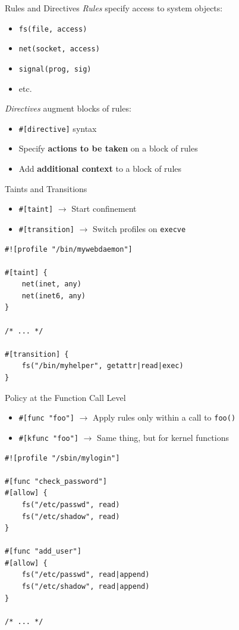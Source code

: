 \documentclass[12pt, dvipsnames, aspectratio=169]{beamer}
\begin{document}
\begin{frame}[c, fragile]{Rules and Directives}
\textit{Rules} specify access to system objects:
\begin{itemize}
    \item \lstinline[language=bpfbox]|fs(file, access)|
    \item \lstinline[language=bpfbox]|net(socket, access)|
    \item \lstinline[language=bpfbox]|signal(prog, sig)|
    \item etc.
\end{itemize}

\vfill
\textit{Directives} augment blocks of rules:
\begin{itemize}
    \item \lstinline[language=bpfbox]|#[directive]| syntax
    \item Specify \textbf{actions to be taken} on a block of rules
    \item Add \textbf{additional context} to a block of rules
\end{itemize}
\end{frame}

\begin{frame}[c, fragile]{Taints and Transitions}
\begin{itemize}
    \item \lstinline[language=bpfbox]|#[taint]|  $\rightarrow$ Start confinement
    \item \lstinline[language=bpfbox]|#[transition]|  $\rightarrow$ Switch profiles on \texttt{execve}
\end{itemize}
\vfill
\begin{lstlisting}[language=bpfbox, xleftmargin=.25\textwidth]
#![profile "/bin/mywebdaemon"]

#[taint] {
    net(inet, any)
    net(inet6, any)
}

/* ... */

#[transition] {
    fs("/bin/myhelper", getattr|read|exec)
}
\end{lstlisting}
\end{frame}

\begin{frame}[c, fragile]{Policy at the Function Call Level}
\begin{itemize}
    \item \lstinline[language=bpfbox]|#[func "foo"]|  $\rightarrow$ Apply rules only within a call to \texttt{foo()}
    \item \lstinline[language=bpfbox]|#[kfunc "foo"]|  $\rightarrow$ Same thing, but for kernel functions
\end{itemize}
\vfill
\begin{lstlisting}[language=bpfbox, xleftmargin=.25\textwidth]
#![profile "/sbin/mylogin"]

#[func "check_password"]
#[allow] {
    fs("/etc/passwd", read)
    fs("/etc/shadow", read)
}

#[func "add_user"]
#[allow] {
    fs("/etc/passwd", read|append)
    fs("/etc/shadow", read|append)
}

/* ... */
\end{lstlisting}
\end{frame}
\end{document}
